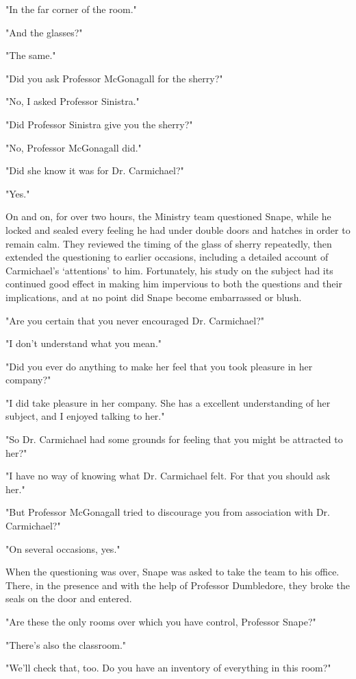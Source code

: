 "In the far corner of the room."

"And the glasses?"

"The same."

"Did you ask Professor McGonagall for the sherry?"

"No, I asked Professor Sinistra."

"Did Professor Sinistra give you the sherry?"

"No, Professor McGonagall did."

"Did she know it was for Dr. Carmichael?"

"Yes."

On and on, for over two hours, the Ministry team questioned Snape, while he locked and sealed every feeling he had under double doors and hatches in order to remain calm. They reviewed the timing of the glass of sherry repeatedly, then extended the questioning to earlier occasions, including a detailed account of Carmichael's `attentions' to him. Fortunately, his study on the subject had its continued good effect in making him impervious to both the questions and their implications, and at no point did Snape become embarrassed or blush.

"Are you certain that you never encouraged Dr. Carmichael?"

"I don't understand what you mean."

"Did you ever do anything to make her feel that you took pleasure in her company?"

"I did take pleasure in her company. She has a excellent understanding of her subject, and I enjoyed talking to her."

"So Dr. Carmichael had some grounds for feeling that you might be attracted to her?"

"I have no way of knowing what Dr. Carmichael felt. For that you should ask her."

"But Professor McGonagall tried to discourage you from association with Dr. Carmichael?"

"On several occasions, yes."

When the questioning was over, Snape was asked to take the team to his office. There, in the presence and with the help of Professor Dumbledore, they broke the seals on the door and entered.

"Are these the only rooms over which you have control, Professor Snape?"

"There's also the classroom."

"We'll check that, too. Do you have an inventory of everything in this room?"

